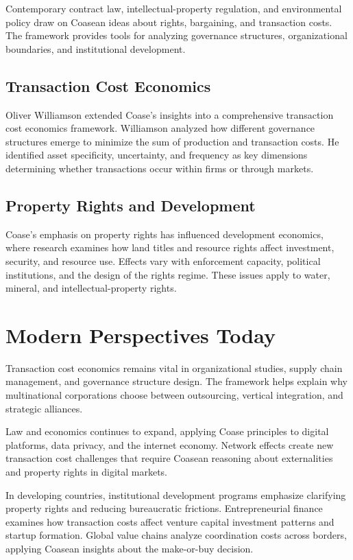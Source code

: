 Contemporary contract law, intellectual-property regulation, and environmental
policy draw on Coasean ideas about rights, bargaining, and transaction costs.
The framework provides tools for analyzing governance structures,
organizational boundaries, and institutional development.

\subsection*{Transaction Cost Economics}
Oliver Williamson extended Coase's insights into a comprehensive transaction cost
economics framework. Williamson analyzed how different governance structures
emerge to minimize the sum of production and transaction costs. He identified
asset specificity, uncertainty, and frequency as key dimensions determining
whether transactions occur within firms or through markets.

\subsection*{Property Rights and Development}
Coase's emphasis on property rights has influenced development economics, where
research examines how land titles and resource rights affect investment,
security, and resource use. Effects vary with enforcement capacity, political
institutions, and the design of the rights regime. These issues apply to water,
mineral, and intellectual-property rights.

\section{Modern Perspectives Today}
Transaction cost economics remains vital in organizational studies, supply chain
management, and governance structure design. The framework helps explain why
multinational corporations choose between outsourcing, vertical integration, and
strategic alliances.

Law and economics continues to expand, applying Coase principles to digital
platforms, data privacy, and the internet economy. Network effects create new
transaction cost challenges that require Coasean reasoning about externalities
and property rights in digital markets.

In developing countries, institutional development programs emphasize clarifying
property rights and reducing bureaucratic frictions. Entrepreneurial finance
examines how transaction costs affect venture capital investment patterns and
startup formation. Global value chains analyze coordination costs across borders,
applying Coasean insights about the make-or-buy decision.

